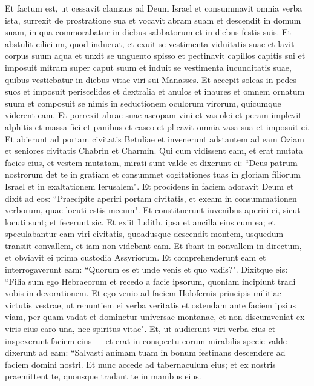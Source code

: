 \begin{biblechapter}  
\verse Et factum est, ut cessavit clamans ad Deum Israel et consummavit omnia verba ista, 
\verse surrexit de prostratione sua et vocavit abram suam et descendit in domum suam, in qua commorabatur in diebus sabbatorum et in diebus festis suis. 
\verse Et abstulit cilicium, quod induerat, et exuit se vestimenta viduitatis suae et lavit corpus suum aqua et unxit se unguento spisso et pectinavit capillos capitis sui et imposuit mitram super caput suum et induit se vestimenta iucunditatis suae, quibus vestiebatur in diebus vitae viri sui Manasses. 
\verse Et accepit soleas in pedes suos et imposuit periscelides et dextralia et anulos et inaures et omnem ornatum suum et composuit se nimis in seductionem oculorum virorum, quicumque viderent eam. 
\verse Et porrexit abrae suae ascopam vini et vas olei et peram implevit alphitis et massa fici et panibus et caseo et plicavit omnia vasa sua et imposuit ei. 
\verse Et abierunt ad portam civitatis Betuliae et invenerunt adstantem ad eam Oziam et seniores civitatis Chabrin et Charmin. 
\verse Qui cum vidissent eam, et erat mutata facies eius, et vestem mutatam, mirati sunt valde et dixerunt ei: 
\verse “Deus patrum nostrorum det te in gratiam et consummet cogitationes tuas in gloriam filiorum Israel et in exaltationem Ierusalem". 
\verse Et procidens in faciem adoravit Deum et dixit ad eos: “Praecipite aperiri portam civitatis, et exeam in consummationen verborum, quae locuti estis mecum". Et constituerunt iuvenibus aperiri ei, sicut locuti sunt; 
\verse et fecerunt sic. Et exiit Iudith, ipsa et ancilla eius cum ea; et speculabantur eam viri civitatis, quoadusque descendit montem, usquedum transiit convallem, et iam non videbant eam. 
\verse Et ibant in convallem in directum, et obviavit ei prima custodia Assyriorum. 
\verse Et comprehenderunt eam et interrogaverunt eam: “Quorum es et unde venis et quo vadis?". Dixitque eis: “Filia sum ego Hebraeorum et recedo a facie ipsorum, quoniam incipiunt tradi vobis in devorationem. 
\verse Et ego venio ad faciem Holofernis principis militiae virtutis vestrae, ut renuntiem ei verba veritatis et ostendam ante faciem ipsius viam, per quam vadat et dominetur universae montanae, et non discumveniat ex viris eius caro una, nec spiritus vitae". 
\verse Et, ut audierunt viri verba eius et inspexerunt faciem eius — et erat in conspectu eorum mirabilis specie valde — dixerunt ad eam: 
\verse “Salvasti animam tuam in bonum festinans descendere ad faciem domini nostri. Et nunc accede ad tabernaculum eius; et ex nostris praemittent te, quousque tradant te in manibus eius. 

\end{biblechapter}
